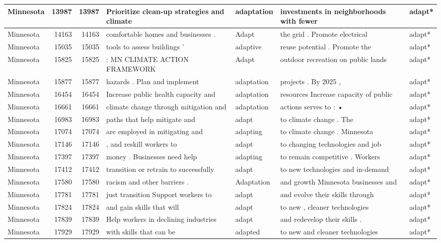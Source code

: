 \documentclass[
]{article}
\begin{document}
\begin{table}
\begin{tabular}[t]{l|r|r|l|l|l|l}
\hline
Minnesota & 13987 & 13987 & Prioritize clean-up strategies and climate & adaptation & investments in neighborhoods with fewer & adapt*\\
\hline
Minnesota & 14163 & 14163 & comfortable homes and businesses . & Adapt & the grid . Promote electrical & adapt*\\
\hline
Minnesota & 15035 & 15035 & tools to assess buildings ’ & adaptive & reuse potential . Promote the & adapt*\\
\hline
Minnesota & 15825 & 15825 & : MN CLIMATE ACTION FRAMEWORK & Adapt & outdoor recreation on public lands & adapt*\\
\hline
Minnesota & 15877 & 15877 & hazards . Plan and implement & adaptation & projects . By 2025 , & adapt*\\
\hline
Minnesota & 16454 & 16454 & Increase public health capacity and & adaptation & resources Increase capacity of public & adapt*\\
\hline
Minnesota & 16661 & 16661 & climate change through mitigation and & adaptation & actions serves to : • & adapt*\\
\hline
Minnesota & 16983 & 16983 & paths that help mitigate and & adapt & to climate change . The & adapt*\\
\hline
Minnesota & 17074 & 17074 & are employed in mitigating and & adapting & to climate change . Minnesota & adapt*\\
\hline
Minnesota & 17146 & 17146 & , and reskill workers to & adapt & to changing technologies and job & adapt*\\
\hline
Minnesota & 17397 & 17397 & money . Businesses need help & adapting & to remain competitive . Workers & adapt*\\
\hline
Minnesota & 17412 & 17412 & transition or retrain to successfully & adapt & to new technologies and in-demand & adapt*\\
\hline
Minnesota & 17580 & 17580 & racism and other barriers . & Adaptation & and growth Minnesota businesses and & adapt*\\
\hline
Minnesota & 17781 & 17781 & just transition Support workers to & adapt & and evolve their skills through & adapt*\\
\hline
Minnesota & 17824 & 17824 & and gain skills that will & adapt & to new , cleaner technologies & adapt*\\
\hline
Minnesota & 17839 & 17839 & Help workers in declining industries & adapt & and redevelop their skills . & adapt*\\
\hline
Minnesota & 17929 & 17929 & with skills that can be & adapted & to new and cleaner technologies & adapt*\\

\end{tabular}
\end{table}
\end{document}
